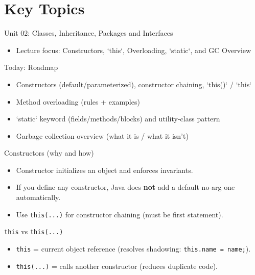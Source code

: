 \documentclass{beamer}
\begin{document}
\section{Key Topics}
\label{sec:concepts}

\begin{frame}{Unit 02: Classes, Inheritance, Packages and Interfaces}
  \begin{itemize}[<+->]
    \item Lecture focus: Constructors, `this`, Overloading, `static`, and GC Overview
  \end{itemize}
  \slidesources{\OOPSUnitIISources}
\end{frame}

\begin{frame}{Today: Roadmap}
  \begin{itemize}[<+->]
    \item Constructors (default/parameterized), constructor chaining, `this()` / `this`
    \item Method overloading (rules + examples)
    \item `static` keyword (fields/methods/blocks) and utility-class pattern
    \item Garbage collection overview (what it is / what it isn't)
  \end{itemize}
  \slidesources{\OOPSUnitIISources}
\end{frame}

\begin{frame}{Constructors (why and how)}
  \begin{itemize}[<+->]
    \item Constructor initializes an object and enforces invariants.
    \item If you define any constructor, Java does \textbf{not} add a default no-arg one automatically.
    \item Use \texttt{this(...)} for constructor chaining (must be first statement).
  \end{itemize}
  \slidesources{\OOPSUnitIISources}
\end{frame}

\begin{frame}{\texttt{this} vs \texttt{this(...)}}
  \begin{itemize}[<+->]
    \item \texttt{this} = current object reference (resolves shadowing: \texttt{this.name = name;}).
    \item \texttt{this(...)} = calls another constructor (reduces duplicate code).
  \end{itemize}
  \slidesources{\OOPSUnitIISources}
\end{frame}
\end{document}
